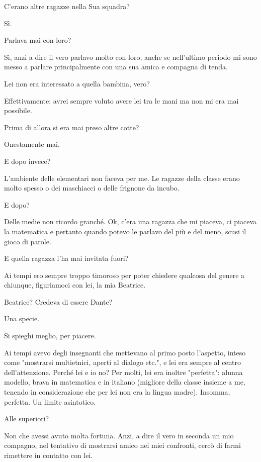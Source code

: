 \documentclass[a4paper,12pt]{article}
\newcommand{\Walter}{\speak{W}}
\newcommand{\Pollazzi}{\speak{P}}
\begin{document}
\begin{dialogue}
\Pollazzi C'erano altre ragazze nella Sua squadra?

\Walter Sì.

\Pollazzi Parlava mai con loro?

\Walter Sì, anzi a dire il vero parlavo molto con loro, anche se nell'ultimo periodo mi sono messo a parlare principalmente con una sua amica e compagna di tenda.

\Pollazzi Lei non era interessato a quella bambina, vero?

\Walter Effettivamente; avrei sempre voluto avere lei tra le mani ma non mi era mai possibile.

\Pollazzi Prima di allora si era mai preso altre cotte?

\Walter Onestamente mai.

\Pollazzi E dopo invece?

\Walter L'ambiente delle elementari non faceva per me. Le ragazze della classe erano molto spesso o dei maschiacci o delle frignone da incubo.

\Pollazzi E dopo?

\Walter Delle medie non ricordo granché. Ok, c'era una ragazza che mi piaceva, ci piaceva la matematica e pertanto quando potevo le parlavo del più e del meno, scusi il gioco di parole.

\Pollazzi E quella ragazza l'ha mai invitata fuori?

\Walter Ai tempi ero sempre troppo timoroso per poter chiedere qualcosa del genere a chiunque, figuriamoci con lei, la mia Beatrice.

\Pollazzi Beatrice? Credeva di essere Dante?

\Walter Una specie.

\Pollazzi Si spieghi meglio, per piacere.

\Walter Ai tempi avevo degli insegnanti che mettevano al primo posto l'aspetto, inteso come "mostrarsi multietnici, aperti al dialogo etc.", e lei era sempre al centro dell'attenzione. Perché lei e io no? Per molti, lei era inoltre "perfetta": alunna modello, brava in matematica e in italiano (migliore della classe insieme a me, tenendo in considerazione che per lei non era la lingua madre). Insomma, perfetta. Un limite asintotico.

\Pollazzi Alle superiori?

\Walter Non che avessi avuto molta fortuna. Anzi, a dire il vero in seconda un mio compagno, nel tentativo di mostrarsi amico nei miei confronti, cercò di farmi rimettere in contatto con lei.


\end{dialogue}
\end{document}
